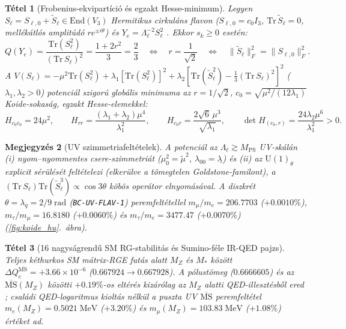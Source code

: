 \documentclass[11pt,a4paper]{article}
\newtheorem{theorem}{Tétel}[section]
\newtheorem{remark}[theorem]{Megjegyzés}
\begin{document}
\begin{theorem}[Frobenius-ekvipartíció és egzakt Hesse-minimum]
Legyen $S_\ell = S_{\ell,0} + \tilde{S}_\ell \in \mathrm{End}(V_3)$ Hermitikus cirkuláns flavon ($S_{\ell,0} = c_0 I_3$, $\mathrm{Tr}\,\tilde{S}_\ell = 0$, mellékátlós amplitúdó $r e^{\pm i\theta}$) és $Y_e = \Lambda_\ell^{-2} S_\ell^2$ \cite{Koide1990,Sumino2009}. Ekkor $s_k \ge 0$ esetén:
\begin{equation}
Q(Y_e) = \frac{\mathrm{Tr}(S_\ell^2)}{(\mathrm{Tr}\,S_\ell)^2} = \frac{1 + 2r^2}{3} = \frac{2}{3}
\quad\Longleftrightarrow\quad r = \frac{1}{\sqrt{2}}
\quad\Longleftrightarrow\quad \|\tilde{S}_\ell\|_F^2 = \|S_{\ell,0}\|_F^2.
\end{equation}
A $V(S_\ell) = -\mu^2\mathrm{Tr}(S_\ell^2) + \lambda_1[\mathrm{Tr}(S_\ell^2)]^2 + \lambda_2[\mathrm{Tr}(\tilde{S}_\ell^2) - \frac{1}{3}(\mathrm{Tr}\,S_\ell)^2]^2$ ($\lambda_1,\lambda_2 > 0$) potenciál szigorú globális minimuma az $r = 1/\sqrt{2}$, $c_0 = \sqrt{\mu^2/(12\lambda_1)}$ Koide-sokaság, egzakt Hesse-elemekkel:
\begin{equation}
H_{c_0 c_0} = 24\mu^2, \qquad
H_{rr} = \frac{(\lambda_1 + \lambda_2)\mu^4}{\lambda_1^2}, \qquad
H_{c_0 r} = \frac{2\sqrt{6}\,\mu^3}{\sqrt{\lambda_1}}, \qquad
\det H_{(c_0,r)} = \frac{24\lambda_2 \mu^6}{\lambda_1^2} > 0.
\end{equation}
\end{theorem}

\begin{remark}[UV szimmetriafeltételek]
A potenciál az $\Lambda_\ell \gtrsim M_{\mathrm{PS}}$ UV-skálán (i) nyom--nyommentes csere-szimmetriát ($\mu_0^2 = \tilde{\mu}^2$, $\lambda_{00} = \lambda_{\tilde{}\tilde{}}$) és (ii) az $\mathrm{U}(1)_\theta$ explicit sérülését feltételezi (elkerülve a tömegtelen Goldstone-familont), a $(\mathrm{Tr}\,S_\ell)\mathrm{Tr}(\tilde{S}_\ell^3) \propto \cos 3\theta$ köbös operátor elnyomásával. A diszkrét $\theta = \lambda_q = 2/9\;\mathrm{rad}$ (\texttt{BC-UV-FLAV-1}) peremfeltétellel $m_\mu/m_e = 206.7703$ ($+0.0010\%$), $m_\tau/m_\mu = 16.8180$ ($+0.0060\%$) és $m_\tau/m_e = 3477.47$ ($+0.0070\%$) (\ref{fig:koide_hu}.~ábra).
\end{remark}

\begin{theorem}[16 nagyságrendű SM RG-stabilitás és Sumino-féle IR-QED pajzs]
Teljes kéthurkos SM mátrix-RGE futás alatt $M_Z$ és $M_*$ között $\Delta Q_e^{\overline{\mathrm{MS}}} = +3.66\times 10^{-6}$ ($0.667924 \to 0.667928$). A pólustömeg ($0.6666605$) és az $\overline{\mathrm{MS}}(M_Z)$ közötti $+0.19\%$-os eltérés kizárólag az $M_Z$ alatti QED-illesztésből ered \cite{Sumino2009}; családi QED-logaritmus kioltás nélkül a puszta UV $\overline{\mathrm{MS}}$ peremfeltétel $m_e(M_Z) = 0.5021\;\mathrm{MeV}$ ($+3.20\%$) és $m_\mu(M_Z) = 103.83\;\mathrm{MeV}$ ($+1.08\%$) értéket ad.
\end{theorem}
\end{document}
